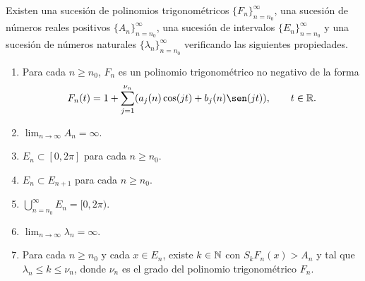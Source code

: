 \documentclass[a4paper, 12pt]{book}
\begin{document}
\begin{lemma}
    Existen una sucesión de polinomios trigonométricos $\{F_n\}_{n=n_0}^\infty$, una sucesión de números reales positivos $\{A_n\}_{n=n_0}^\infty$, una sucesión de intervalos $\{E_n\}_{n=n_0}^\infty$ y una sucesión de números naturales $\{\lambda_n\}_{n=n_0}^\infty$ verificando las siguientes propiedades.
    \begin{enumerate}
        \item Para cada $n \geq n_0$, $F_n$ es un polinomio trigonométrico no negativo de la forma
        \[F_n(t)=1+\sum_{j=1}^{\nu_n}(a_j(n)\cos(jt)+b_j(n)\sen(jt)), \qquad t \in \R.\]
        \item $\lim_{n \to \infty} A_n = \infty$.
        \item $E_n \subset [0,2\pi]$ para cada $n \geq n_0$.
        \item $E_n \subset E_{n+1}$ para cada $n \geq n_0$.
        \item $\bigcup_{n=n_0}^\infty E_n = [0,2\pi)$.
        \item $\lim_{n\to\infty} \lambda_n = \infty$.
        \item Para cada $n \geq n_0$ y cada $x \in E_n$, existe $k \in \mathbb N$ con $S_kF_n(x) > A_n$ y tal que $\lambda_n \leq k \leq \nu_n$, donde $\nu_n$ es el grado del polinomio trigonométrico $F_n$.
    \end{enumerate}
\end{lemma}
\end{document}
